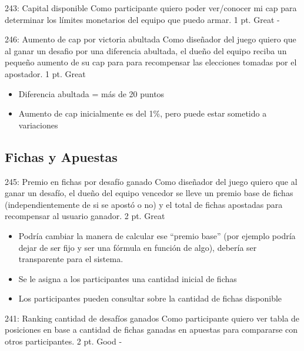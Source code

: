 \vspace{1cm}

\vspace{1cm}

\simplestory
{243: Capital disponible}
{Como participante quiero poder ver/conocer mi cap para determinar los límites monetarios del equipo que puedo armar.}
{1 pt.}
{Great}
{-}

\vspace{1cm}

\simplestory
{246: Aumento de cap por victoria abultada}
{Como diseñador del juego quiero que al ganar un desafio por una diferencia abultada, el dueño del equipo reciba un pequeño aumento de su cap para para recompensar las elecciones tomadas por el apostador.}
{1 pt.}
{Great}
{\begin{itemize}
\item Diferencia abultada = más de 20 puntos
\item Aumento de cap inicialmente es del 1\%, pero puede estar sometido a variaciones
\end{itemize}}

\vspace{1cm}

\subsection{Fichas y Apuestas}

\simplestory
{245: Premio en fichas por desafío ganado}
{Como diseñador del juego quiero que al ganar un desafío, el dueño del equipo vencedor se lleve un premio base de fichas (independientemente de si se apostó o no) y el total de fichas apostadas para recompensar al usuario ganador.
}
{2 pt.}
{Great}
{\begin{itemize}
\item Podría cambiar la manera de calcular ese ``premio base'' (por ejemplo podría dejar de ser fijo y ser una fórmula en función de algo), debería ser transparente para el sistema.
\item Se le asigna a los participantes una cantidad inicial de fichas
\item Los participantes pueden consultar sobre la cantidad de fichas disponible
\end{itemize}}

\vspace{1cm}

\simplestory
{241: Ranking cantidad de desafíos ganados}
{Como participante quiero ver tabla de posiciones en base a cantidad de fichas ganadas en apuestas para compararse con otros participantes.}
{2 pt.}
{Good}
{-}

